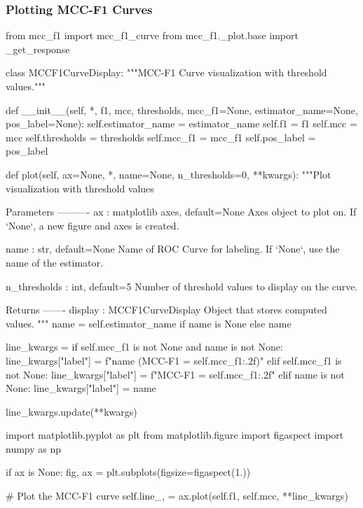 \subsubsection{Plotting MCC-F1 Curves}\label{appendix:mcc_f1_curves}
\begin{pythoncode}
from mcc_f1 import mcc_f1_curve
from mcc_f1._plot.base import _get_response

class MCCF1CurveDisplay:
    """MCC-F1 Curve visualization with threshold values."""

    def __init__(self, *, f1, mcc, thresholds,
                 mcc_f1=None, estimator_name=None, pos_label=None):
        self.estimator_name = estimator_name
        self.f1 = f1
        self.mcc = mcc
        self.thresholds = thresholds
        self.mcc_f1 = mcc_f1
        self.pos_label = pos_label

    def plot(self, ax=None, *, name=None, n_thresholds=0, **kwargs):
        """Plot visualization with threshold values

        Parameters
        ----------
        ax : matplotlib axes, default=None
            Axes object to plot on. If `None`, a new figure and axes is created.

        name : str, default=None
            Name of ROC Curve for labeling. If `None`, use the name of the estimator.

        n_thresholds : int, default=5
            Number of threshold values to display on the curve.

        Returns
        -------
        display : MCCF1CurveDisplay
            Object that stores computed values.
        """
        name = self.estimator_name if name is None else name

        line_kwargs = {}
        if self.mcc_f1 is not None and name is not None:
            line_kwargs["label"] = f"{name} (MCC-F1 = {self.mcc_f1:.2f})"
        elif self.mcc_f1 is not None:
            line_kwargs["label"] = f"MCC-F1 = {self.mcc_f1:.2f}"
        elif name is not None:
            line_kwargs["label"] = name

        line_kwargs.update(**kwargs)

        import matplotlib.pyplot as plt
        from matplotlib.figure import figaspect
        import numpy as np

        if ax is None:
            fig, ax = plt.subplots(figsize=figaspect(1.))

        # Plot the MCC-F1 curve
        self.line_, = ax.plot(self.f1, self.mcc, **line_kwargs)


\end{pythoncode}
